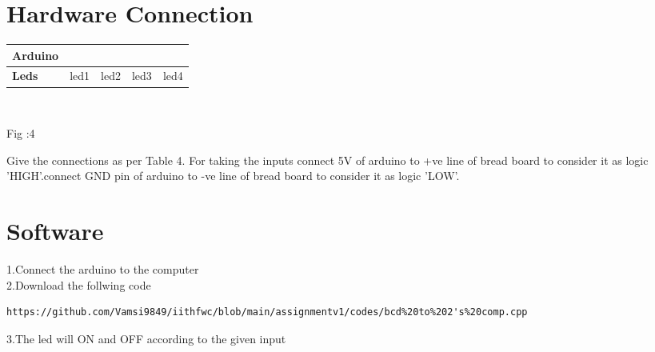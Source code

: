 \documentclass[10pt, a4paper]{article}
\begin{document}
     
    \section{Hardware Connection}


    
     \begin{tabularx}{0.4\textwidth} {  
  | >{\centering\arraybackslash}X
  | >{\centering\arraybackslash}X 
  | >{\centering\arraybackslash}X 
  | >{\centering\arraybackslash}X  
  | >{\centering\arraybackslash}X |}
  \hline
\textbf{Arduino} &  2  &  3  &  4  &  5\\
\hline
\textbf{Leds}    & led1 & led2 & led3 & led4\\
\hline
 \end{tabularx}\\

 \begin{center}
 Fig :4
   \end{center}




   Give the connections as per Table 4. For taking the inputs connect 5V of arduino to +ve line of bread board to consider it as logic 'HIGH'.connect GND pin of arduino to -ve line of bread board to consider it as logic 'LOW'.


    
    
 
 


  
  \section{Software}
  1.Connect the arduino to the computer
  \\2.Download the follwing code
  
  \begin{lstlisting}
https://github.com/Vamsi9849/iithfwc/blob/main/assignmentv1/codes/bcd%20to%202's%20comp.cpp
  \end{lstlisting}
  3.The led will ON and OFF according to the given input 




    

    
 
\end{document}
